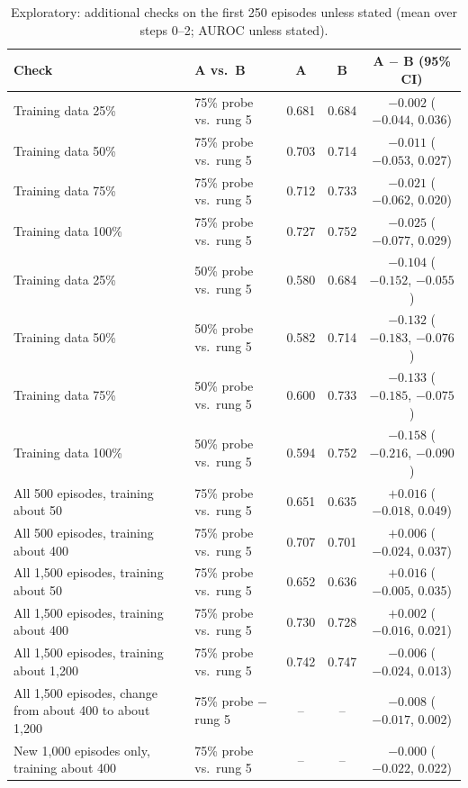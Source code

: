 \begin{table}[htbp]
\centering\small
\caption{Exploratory: additional checks on the first 250 episodes unless stated (mean over steps 0--2; AUROC unless stated).}\label{tab:extra}
\begin{tabularx}{\linewidth}{@{}LLccc@{}}
\toprule
Check & A vs.\ B & A & B & A $-$ B (95\% CI) \\
\midrule
Training data 25\% & 75\% probe vs.\ rung 5 & 0.681 & 0.684 & $-0.002$ ($-0.044$, 0.036) \\
Training data 50\% & 75\% probe vs.\ rung 5 & 0.703 & 0.714 & $-0.011$ ($-0.053$, 0.027) \\
Training data 75\% & 75\% probe vs.\ rung 5 & 0.712 & 0.733 & $-0.021$ ($-0.062$, 0.020) \\
Training data 100\% & 75\% probe vs.\ rung 5 & 0.727 & 0.752 & $-0.025$ ($-0.077$, 0.029) \\
Training data 25\% & 50\% probe vs.\ rung 5 & 0.580 & 0.684 & $-0.104$ ($-0.152$, $-0.055$) \\
Training data 50\% & 50\% probe vs.\ rung 5 & 0.582 & 0.714 & $-0.132$ ($-0.183$, $-0.076$) \\
Training data 75\% & 50\% probe vs.\ rung 5 & 0.600 & 0.733 & $-0.133$ ($-0.185$, $-0.075$) \\
Training data 100\% & 50\% probe vs.\ rung 5 & 0.594 & 0.752 & $-0.158$ ($-0.216$, $-0.090$) \\
All 500 episodes, training about 50 & 75\% probe vs.\ rung 5 & 0.651 & 0.635 & $+0.016$ ($-0.018$, 0.049) \\
All 500 episodes, training about 400 & 75\% probe vs.\ rung 5 & 0.707 & 0.701 & $+0.006$ ($-0.024$, 0.037) \\
All 1,500 episodes, training about 50 & 75\% probe vs.\ rung 5 & 0.652 & 0.636 & $+0.016$ ($-0.005$, 0.035) \\
All 1,500 episodes, training about 400 & 75\% probe vs.\ rung 5 & 0.730 & 0.728 & $+0.002$ ($-0.016$, 0.021) \\
All 1,500 episodes, training about 1,200 & 75\% probe vs.\ rung 5 & 0.742 & 0.747 & $-0.006$ ($-0.024$, 0.013) \\
All 1,500 episodes, change from about 400 to about 1,200 & 75\% probe $-$ rung 5 & -- & -- & $-0.008$ ($-0.017$, 0.002) \\
New 1,000 episodes only, training about 400 & 75\% probe vs.\ rung 5 & -- & -- & $-0.000$ ($-0.022$, 0.022) \\

\end{tabularx}
\end{table}
